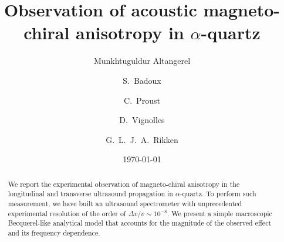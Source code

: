 \documentclass[prl,twocolumn]{revtex4-2}
\begin{document}
\title[aMChA quartz]{Observation of acoustic magneto-chiral anisotropy in $\alpha$-quartz}

\author{Munkhtuguldur Altangerel}
\author{S.~Badoux}
\author{C.~Proust}
\author{D.~Vignolles}
\author{G.~L.~J.~A.~Rikken}

\date{\today}

\begin{abstract}
We report the experimental observation of magneto-chiral anisotropy in the longitudinal and transverse ultrasound propagation in $\alpha$-quartz. To perform such measurement, we have built an ultrasound spectrometer with unprecedented experimental resolution of the order of $\Delta v/v \sim 10^{-8}$.  We present a simple macroscopic Becquerel-like analytical model that accounts for the magnitude of the observed effect and its frequency dependence.
\end{abstract}

\maketitle
\end{document}
